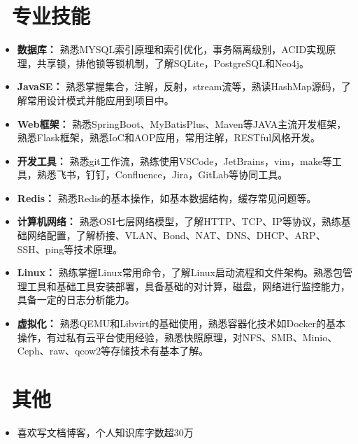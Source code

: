 \documentclass[11pt]{article}
\begin{document}
\section{\makebox[\widthof{\faGraduationCap}][c]{\color{CVBlue}\faWrench}\ 专业技能}

\begin{itemize}
    \item \textbf{数据库：} 熟悉MYSQL索引原理和索引优化，事务隔离级别，ACID实现原理，共享锁，排他锁等锁机制，了解SQLite，PostgreSQL和Neo4j。
    \item \textbf{JavaSE：} 熟悉掌握集合，注解，反射，stream流等，熟读HashMap源码，了解常用设计模式并能应用到项目中。
    \item \textbf{Web框架：} 熟悉SpringBoot、MyBatisPlus、Maven等JAVA主流开发框架，熟悉Flask框架，熟悉IoC和AOP应用，常用注解，RESTful风格开发。
    \item \textbf{开发工具：} 熟悉git工作流，熟练使用VSCode，JetBrains，vim，make等工具，熟悉飞书，钉钉，Confluence，Jira，GitLab等协同工具。
    \item \textbf{Redis：} 熟悉Redis的基本操作，如基本数据结构，缓存常见问题等。
    \item \textbf{计算机网络：} 熟悉OSI七层网络模型，了解HTTP、TCP、IP等协议，熟练基础网络配置，了解桥接、VLAN、Bond、NAT、DNS、DHCP、ARP、SSH、ping等技术原理。
    \item \textbf{Linux：} 熟练掌握Linux常用命令，了解Linux启动流程和文件架构。熟悉包管理工具和基础工具安装部署，具备基础的对计算，磁盘，网络进行监控能力，具备一定的日志分析能力。
    \item \textbf{虚拟化：} 熟悉QEMU和Libvirt的基础使用，熟悉容器化技术如Docker的基本操作，有过私有云平台使用经验，熟悉快照原理，对NFS、SMB、Minio、Ceph、raw、qcow2等存储技术有基本了解。

\end{itemize}




\section{\makebox[\widthof{\faGraduationCap}][c]{\color{CVBlue}\faTags}\ 其他} 
  \begin{itemize}
    \item 喜欢写文档博客，个人知识库字数超30万
\end{itemize}

 



\end{document}
